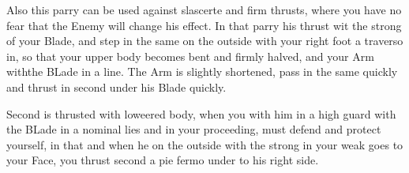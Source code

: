 
Also this parry can be used against slascerte and firm thrusts, where you have no fear that the
Enemy will change his effect. In that parry his thrust wit the strong
of your Blade, and step in the same on the outside with your right
foot a traverso in, so that your upper body becomes bent and firmly
halved, and your Arm withthe BLade in a line. The Arm is slightly
shortened, pass in the same quickly and thrust in second under his
Blade quickly.


Second is thrusted with loweered body, when you with him in a high
guard with the BLade in a nominal lies and in your proceeding,
must defend and protect yourself, in that and when he on the outside
with the strong in your weak goes to your Face, you thrust second a
pie fermo under to his right side.


